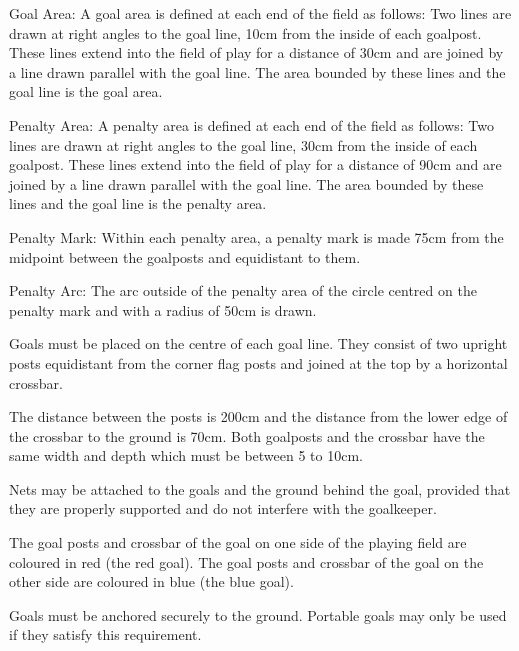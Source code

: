 \documentclass[12pt]{hurocup}
\begin{document}
\begin{lawlist}[US]
\item Goal Area: A goal area is defined at each end of the field as
  follows: Two lines are drawn at right angles to the goal line, 10cm
  from the inside of each goalpost. These lines extend into the field
  of play for a distance of 30cm and are joined by a line drawn
  parallel with the goal line. The area bounded by these lines and the
  goal line is the goal area.
  
\item Penalty Area: A penalty area is defined at each end of the field
  as follows: Two lines are drawn at right angles to the goal line,
  30cm from the inside of each goalpost. These lines extend into the
  field of play for a distance of 90cm and are joined by a line drawn
  parallel with the goal line. The area bounded by these lines and the
  goal line is the penalty area.
  
\item \label{penalty-mark} Penalty Mark: Within each penalty area, a
  penalty mark is made 75cm from the midpoint between the goalposts
  and equidistant to them.
  
\item \label{penalty-arc} Penalty Arc: The arc outside of the penalty
  area of the circle centred on the penalty mark and with a radius of
  50cm is drawn.

\item Goals must be placed on the centre of each goal line. They
  consist of two upright posts equidistant from the corner flag posts
  and joined at the top by a horizontal crossbar.
  
\item The distance between the posts is 200cm and the distance from
  the lower edge of the crossbar to the ground is 70cm. Both goalposts
  and the crossbar have the same width and depth which must be between
  5 to 10cm.
  
\item Nets may be attached to the goals and the ground behind the
  goal, provided that they are properly supported and do not interfere
  with the goalkeeper.
  
\item The goal posts and crossbar of the goal on one side of the
  playing field are coloured in red (the red goal).
  The goal posts and crossbar of the goal on the other side are
  coloured in blue (the blue goal).
  
\item Goals must be anchored securely to the ground. Portable goals
  may only be used if they satisfy this requirement.

\end{lawlist}
\end{document}
